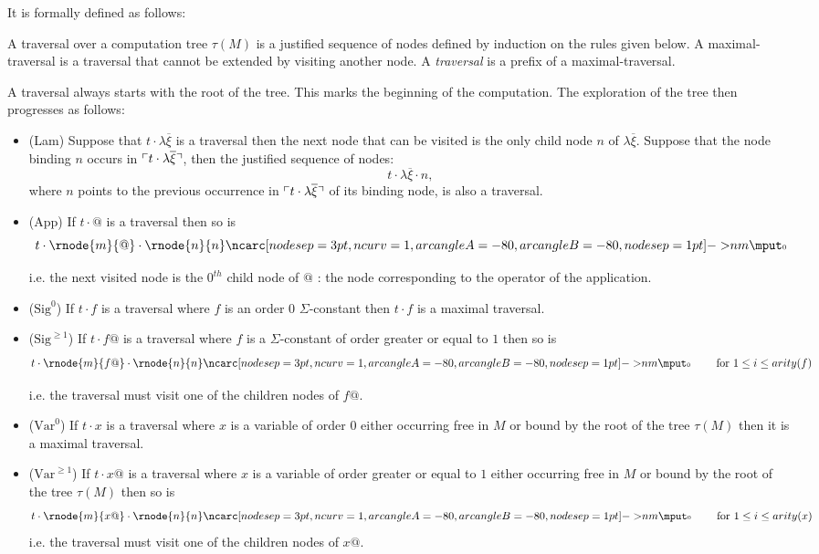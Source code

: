 It is formally defined as follows:

\begin{dfn}[Traversal]
\label{def:traversal} A traversal over a computation tree $\tau(M)$
is a justified sequence of nodes defined by induction on the rules
given below. A maximal-traversal is a traversal that cannot be
extended by visiting another node. A \emph{traversal} is a prefix of
a maximal-traversal.

A traversal always starts with the root of the tree. This marks the
beginning of the computation. The exploration of the tree then
progresses as follows:
\begin{itemize}
\item (Lam) Suppose that $t \cdot \lambda \overline{\xi}$ is a traversal then the next node that can be visited is the only child
node $n$ of $\lambda \overline{\xi}$. Suppose that the node binding
$n$ occurs in $\ulcorner t \cdot \lambda \overline{\xi} \urcorner$, then the
justified sequence of nodes:
$$t \cdot \lambda \overline{\xi} \cdot n,$$
where $n$ points to the previous occurrence in $\ulcorner t \cdot
\lambda \overline{\xi} \urcorner$ of its binding node, is also a traversal.

\item (App) If $t \cdot @$ is a traversal then so is
$$t \cdot \rnode{m}{@} \cdot
\rnode{n}{n} \bkptra[nodesep=1pt]{80}{n}{m} \bklabelb{0}
$$

i.e. the next visited node is the $0^{th}$ child node of $@$ : the
node corresponding to the operator of the application.


\item ($\mbox{Sig}^0$) If $t \cdot f$ is a traversal where $f$ is an order 0 $\Sigma$-constant then $t \cdot f$ is a maximal traversal.

\item ($\mbox{Sig}^{\geq 1}$) If $t \cdot f@$ is a traversal where $f$ is a $\Sigma$-constant of order greater or equal to
$1$ then so is
$$t \cdot \rnode{m}{f@} \cdot
\rnode{n}{n} \bkptra[nodesep=1pt]{80}{n}{m} \bklabelb{0} \qquad
\mbox{ for } 1 \leq i \leq arity(f) $$

i.e. the traversal must visit one of the children nodes of $f@$.

\item ($\mbox{Var}^0$) If $t \cdot x$ is a traversal where $x$ is a variable of order $0$ either occurring free in $M$
or bound by the root of the tree $\tau(M)$ then it is a maximal
traversal.

\item ($\mbox{Var}^{\geq 1}$) If $t \cdot x@$ is a traversal where $x$ is a variable of order greater or equal to $1$ either occurring free in $M$
or bound by the root of the tree $\tau(M)$ then so is
$$t \cdot \rnode{m}{x@} \cdot
\rnode{n}{n} \bkptra[nodesep=1pt]{80}{n}{m} \bklabelb{0} \qquad
\mbox{ for } 1 \leq i \leq arity(x) $$ i.e. the traversal must visit
one of the children nodes of $x@$.



\end{itemize}
\end{dfn}
